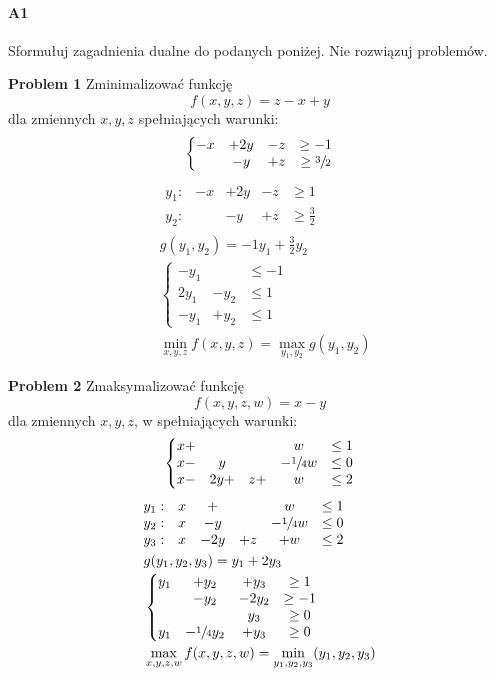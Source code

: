 \paragraph{A1} Sformułuj zagadnienia dualne do podanych poniżej. Nie rozwiązuj problemów.\\
\begin{minipage}{.5\textwidth}
\textbf{Problem 1} Zminimalizować funkcję
$$f(x, y, z) = z - x + y$$
dla zmiennych $x, y, z$ spełniających warunki:
$$\left\{\begin{matrix}
-x &+ 2y &- z &\geq -1\\
&-y &+z &\geq \sfrac{3}{2}
\end{matrix}\right.$$
\begin{align*}
&\begin{matrix}
y_1: & -x&+2y&-z&\geq 1\\
y_2:& &-y&+z&\geq\frac{3}{2}
\end{matrix}\\
&g(y_1,y_2)=-1y_1+\frac{3}{2}y_2\\
&\left\{\begin{matrix}
-y_1 &&\leq -1\\
2y_1&-y_2&\leq 1\\
-y_1&+y_2&\leq 1
\end{matrix}\right.\\
&\min _{x,y,z}f(x,y,z)=\max _{y_1,y_2} g(y_1,y_2)
\end{align*}
\end{minipage}%
\begin{minipage}{.5\textwidth}
\textbf{Problem 2} Zmaksymalizować funkcję
$$f(x, y, z, w) = x - y$$
dla zmiennych $x, y, z$, w spełniających warunki:
$$\left\{\begin{matrix}
x +&&& w &\leq 1\\
x -& y &&- \sfrac{1}{4}w &\leq 0\\
x -&2y +& z +&w &\leq 2
\end{matrix}\right.$$
\begin{align*}
&\begin{matrix}
y_1: & x &+ 	&	& w	&\leq  1\\
y_2: & x &- y  	&	&- \sfrac{1}{4} w &\leq 0\\
y_3: & x &- 2y 	&+z	&+w	&\leq 2
\end{matrix}\\
&g(y_1,y_2,y_3)=y_1+2y_3\\
&\left\{\begin{matrix}
y_1 &+ y_2 &+ y_3 &\geq 1\\
&-y_2 & -2y_2 &\geq -1\\
&&y_3 &\geq 0\\
y_1 &- \sfrac{1}{4} y_2 &+ y_3 &\geq 0
\end{matrix}\right.\\
&\max _{x,y,z,w} f(x,y,z,w)=\min _{y_1,y_2,y_3} (y_1,y_2,y_3)
\end{align*}
\end{minipage}

